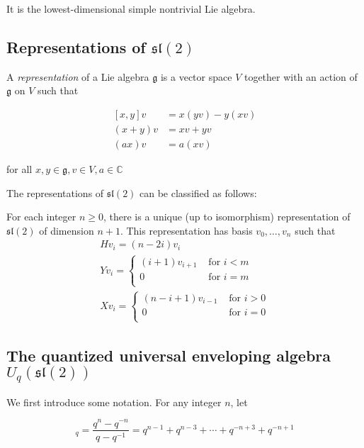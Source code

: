 \documentclass[]{article}
\begin{document}
It is the lowest-dimensional simple nontrivial Lie algebra. 

\subsection{Representations of $\mathfrak{sl}(2)$}

A \emph{representation} of a Lie algebra $\mathfrak{g}$ is a vector space $V$ together with an action of $\mathfrak{g}$ on $V$ such that 

\begin{align*}
    \left[ x,y \right] v &= x(yv) - y(xv) \\
    (x+y)v &= xv + yv \\
    (ax)v &= a(xv)
\end{align*}

for all $x,y \in \mathfrak{g}, v \in V, a \in \mathbb{C}$

The representations of $\mathfrak{sl}(2)$ can be classified as follows: 

For each integer $n \geq 0$, there is a unique (up to isomorphism) representation of $\mathfrak{sl}(2)$ of dimension $n+1$. This representation has basis $v_0, \ldots, v_{n}$ such that
\begin{align*}
    &H v_i = (n - 2i) v_i& \\
    &Y v_i = \begin{cases} 
                (i+1)v_{i+1}& \text{ for $i < m$} \\
                0& \text{ for $i = m$} \\
            \end{cases} \\
    &X v_i = \begin{cases} 
                (n-i+1)v_{i-1}& \text{ for $i > 0$} \\
                0& \text{ for $i = 0$} \\
            \end{cases}
\end{align*}

\subsection{The quantized universal enveloping algebra $U_q(\mathfrak{sl}(2))$}
We first introduce some notation. For any integer $n$, let 

\begin{equation}
    [n]_q = \frac{q^n - q^{-n}}{q - q^{-1}} = q^{n-1} + q^{n-3} + \cdots + q^{-n+3} + q^{-n+1}
\end{equation}
\end{document}
